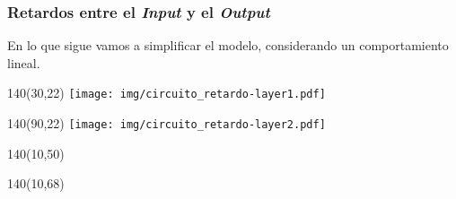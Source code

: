 \documentclass[aspectratio=169]{beamer}
\begin{document}
\begin{frame}[fragile,t]
    \frametitle{Retardos entre el \emph{Input} y el \emph{Output}}
    En lo que sigue vamos a simplificar el modelo, \textcolor{verdeuca}{considerando un comportamiento lineal.}
    \begin{textblock}{140}(30,22) \texttt{[image: img/circuito\_retardo-layer1.pdf]} \end{textblock}
    \begin{textblock}{140}(90,22) \texttt{[image: img/circuito\_retardo-layer2.pdf]} \end{textblock}
    \begin{textblock}{140}(10,50)
    \end{textblock}
    \begin{textblock}{140}(10,68)
    \end{textblock}
\end{frame}
\end{document}
